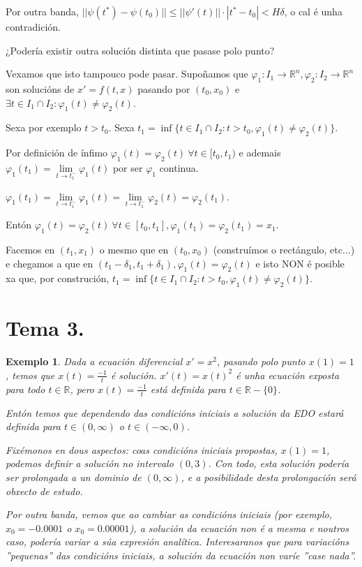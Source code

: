 \documentclass[11pt, a4paper,twoside]{article}
\makeatletter
\theoremstyle{theorem-style}  %
\renewenvironment{proof}[1][\proofname]{\par
	\pushQED{\qed}%
	\normalfont \topsep6\p@\@plus6\p@\relax
	\list{}{%
		\settowidth{\leftmargin}{\quad:\hskip\labelsep}%
		\setlength{\labelwidth}{0pt}%
		\setlength{\itemindent}{-\leftmargin}%
	}%
	\item[\hskip\labelsep\itshape#1\@addpunct{:}]\ignorespaces
}{%
	\popQED\endlist\@endpefalse
}
\theoremstyle{definition-style}
\theoremstyle{example-style}
\newtheorem{example}{Exemplo}[section]
\let\oldsection\section
\def\section{\cleardoublepage\oldsection}
\makeatother
\begin{document}
\begin{proof}
\begin{adjustwidth}{1cm}{}
		Por outra banda, $ ||\psi(t^*)-\psi(t_0)||\leq ||\psi'(t)||\cdot |t^*-t_0|<H\delta $, o cal é unha contradición.
	\end{adjustwidth}
	
	¿Podería existir outra solución distinta que pasase polo punto?
	\begin{adjustwidth}{1cm}{}
		Vexamos que isto tampouco pode pasar. Supoñamos que $ \varphi_1: I_1\longrightarrow\mathbb{R}^n, \varphi_2:I_2 \longrightarrow \mathbb{R}^n $ son solucións de $ x'=f(t,x) $ pasando por $ (t_0,x_0) $ e $ \exists t\in I_1\cap I_2 : \varphi_1(t)\neq \varphi_2(t) $.
		
		Sexa por exemplo $ t>t_0 $. Sexa $ t_1=\inf \{t \in I_1\cap I_2 :t>t_0, \varphi_1(t)\neq \varphi_2(t)  \} $.
		
		Por definición de ínfimo $ \varphi_1(t)=\varphi_2(t) \ \forall t \in [t_0, t_1) $ e ademais $ \varphi_1(t_1)=\lim\limits_{t\to t_1^-} \varphi_1(t) $ por ser $ \varphi_1 $ continua.
		
		$ \varphi_1(t_1)=\lim\limits_{t\to t_1^-} \varphi_1(t)=\lim\limits_{t\to t_1^-} \varphi_2(t)= \varphi_2(t_1) $.
		
		Entón $ \varphi_1(t)=\varphi_2(t) \ \forall t \in [t_0,t_1], \varphi_1(t_1)=\varphi_2(t_1)=x_1 $.
		
		Facemos en $ (t_1, x_1) $ o mesmo que en $ (t_0,x_0) $ (construímos o rectángulo, etc...) e chegamos a que en $ (t_1-\delta_1, t_1+\delta _1), \varphi_1(t)=\varphi_2(t) $ e isto NON é posible xa que, por construción, $ t_1=\inf \{t\in I_1\cap I_2 : t>t_0, \varphi_1(t)\neq \varphi_2(t)\} $.
	\end{adjustwidth}
\end{proof}

\section{Tema 3.}
\begin{example}
	Dada a ecuación diferencial $ x'=x^2 $, pasando polo punto $ x(1)=1 $, temos que $ x(t)=\frac{-1}{t} $ é solución. $ x'(t)=x(t)^2 $ é unha ecuación exposta para todo $ t \in \mathbb{R} $, pero $ x(t)=\frac{-1}{t} $ está definida para $ t \in \mathbb{R}-\{0\} $.
	
	Entón temos que dependendo das condicións iniciais a solución da EDO estará definida para $ t\in (0,\infty) $ o $ t\in (-\infty,0) $.
	
	Fixémonos en dous aspectos: coas condicións iniciais propostas, $ x(1)=1 $, podemos definir a solución no intervalo $ (0,3) $. Con todo, esta solución podería ser prolongada a un dominio de $ (0,\infty) $, e a posibilidade desta prolongación será obxecto de estudo.
	
	Por outra banda, vemos que ao cambiar as condicións iniciais (por exemplo, $ x_0=-0.0001 $ o $ x_0=0.00001 $), a solución da ecuación non é a mesma e noutros caso, podería variar a súa expresión analítica. Interesaranos que para variacións ''pequenas'' das condicións iniciais, a solución da ecuación non varíe ''case nada''.
\end{example}
\end{document}
